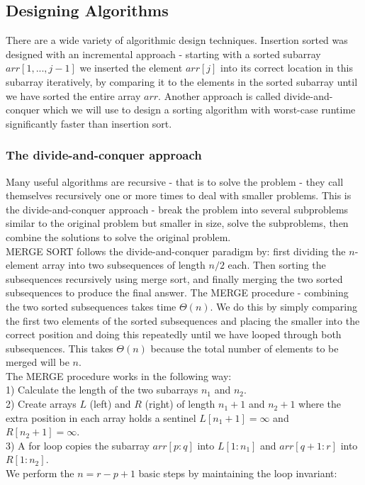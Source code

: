 \documentclass{scrartcl}
\theoremstyle{definition}
\theoremstyle{definition}
\theoremstyle{remark}
\numberwithin{equation}{section}
\begin{document}
\subsection{Designing Algorithms}
There are a wide variety of algorithmic design techniques. Insertion sorted was designed with an incremental approach - starting with a sorted subarray $arr[1,...,j-1]$ we inserted the element $arr[j]$ into its correct location in this subarray iteratively, by comparing it to the elements in the sorted subarray until we have sorted the entire array $arr$. Another approach is called divide-and-conquer which we will use to design a sorting algorithm with worst-case runtime significantly faster than insertion sort.
\subsubsection{The divide-and-conquer approach}
Many useful algorithms are recursive - that is to solve the problem - they call themselves recursively one or more times to deal with smaller problems. This is the divide-and-conquer approach - break the problem into several subproblems similar to the original problem but smaller in size, solve the subproblems, then combine the solutions to solve the original problem.\\
MERGE SORT follows the divide-and-conquer paradigm by: first dividing the $n$-element array into two subsequences of length $n/2$ each. Then sorting the subsequences recursively using merge sort, and finally merging the two sorted subsequences to produce the final answer. The MERGE procedure - combining the two sorted subsequences takes time $\Theta(n)$. We do this by simply comparing the first two elements of the sorted subsequences and placing the smaller into the correct position and doing this repeatedly until we have looped through both subsequences. This takes $\Theta(n)$ because the total number of elements to be merged will be $n$.\\
The MERGE procedure works in the following way:\\
1) Calculate the length of the two subarrays $n_1$ and $n_2$.\\
2) Create arrays $L$ (left) and $R$ (right) of length $n_1+1$ and $n_2+1$ where the extra position in each array holds a sentinel $L[n_1+1]=\infty$ and $R[n_2+1]=\infty$. \\
3) A for loop copies the subarray $arr[p:q]$ into $L[1:n_1]$ and $arr[q+1:r]$ into $R[1:n_2]$. \\
We perform the $n=r-p+1$ basic steps by maintaining the loop invariant:\\
\end{document}
